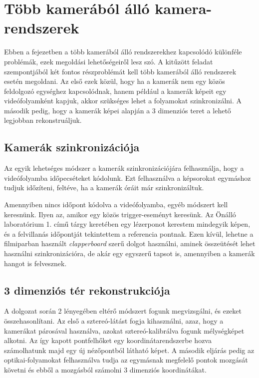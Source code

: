 \chapter{Több kamerából álló kamera-rendszerek}

Ebben a fejezetben a több kamerából álló rendszerekhez kapcsolódó különféle problémák, ezek megoldási lehetőségeiről lesz szó. A kitűzött feladat szempontjából két fontos részproblémát kell több kamerából álló rendszerek esetén megoldani. Az első ezek közül, hogy ha a kamerák nem egy közös feldolgozó egységhez kapcsolódnak, hanem például a kamerák képeit egy videófolyamként kapjuk, akkor szükséges lehet a folyamokat szinkronizálni. A második pedig, hogy a kamerák képei alapján a 3 dimenziós teret a lehető legjobban rekonstruáljuk.

\section{Kamerák szinkronizációja}

Az egyik lehetséges módszer a kamerák szinkronizációjára felhasználja, hogy a videófolyamba időpecséteket kódolunk. Ezt felhasználva a képsorokat egymáshoz tudjuk időzíteni, feltéve, ha a kamerák óráit már szinkronizáltuk.

Amennyiben nincs időpont kódolva a videófolyamba, egyéb módszert kell keresnünk. Ilyen az, amikor egy közös trigger-eseményt keresünk. Az Önálló laboratórium 1. című tárgy keretében \cite{onlab-1} egy lézerponot kerestem mindegyik képen, és a felvillanás időpontját tekintettem a referencia pontnak. Ezen kívül, lehetne a filmiparban használt \textit{clapperboard} szerű dolgot használni, aminek összeütését lehet használni szinkronizációra, de akár egy egyszerű tapsot is, amennyiben a kamerák hangot is felvesznek.

\section{3 dimenziós tér rekonstrukciója}

A dolgozat során 2 lényegében eltérő módszert fogunk megvizsgálni, és ezeket összehasonlítani. Az első a sztereó-látást fogja kihasználni, azaz, hogy a kamerákat párosával használva, azokat sztereó-kalibrálva fogunk mélységképet alkotni. Az így kapott pontfelhőket egy koordinátarendszerbe hozva számolhatunk majd egy új nézőpontból látható képet. A második eljárás pedig az optikai-folyamokat felhasználva tudja az egymásnak megfelelő pontok mozgását követni és ebből a mozgásból számolni 3 dimenziós koordinátákat.

